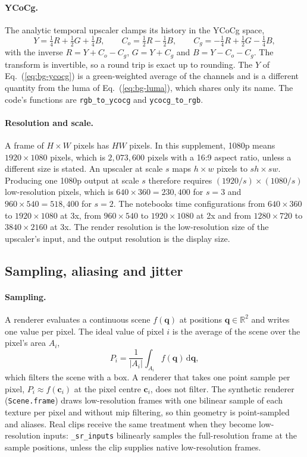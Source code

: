 \paragraph{YCoCg.} The analytic temporal upscaler clamps its history in the YCoCg space,
\begin{equation}
Y=\tfrac14R+\tfrac12G+\tfrac14B,\qquad C_o=\tfrac12R-\tfrac12B,\qquad C_g=-\tfrac14R+\tfrac12G-\tfrac14B,\label{eq:bg-ycocg}
\end{equation}
with the inverse $R=Y+C_o-C_g$, $G=Y+C_g$ and $B=Y-C_o-C_g$. The transform is invertible, so a round trip is exact up to rounding. The $Y$ of Eq.~(\ref{eq:bg-ycocg}) is a green-weighted average of the channels and is a different quantity from the luma of Eq.~(\ref{eq:bg-luma}), which shares only its name. The code's functions are \texttt{rgb\_to\_ycocg} and \texttt{ycocg\_to\_rgb}.

\paragraph{Resolution and scale.} A frame of $H\times W$ pixels has $HW$ pixels. In this supplement, 1080p means $1920\times1080$ pixels, which is $2{,}073{,}600$ pixels with a 16:9 aspect ratio, unless a different size is stated. An upscaler at scale $s$ maps $h\times w$ pixels to $sh\times sw$. Producing one 1080p output at scale $s$ therefore requires $(1920/s)\times(1080/s)$ low-resolution pixels, which is $640\times360=230{,}400$ for $s=3$ and $960\times540=518{,}400$ for $s=2$. The notebooks time configurations from $640\times360$ to $1920\times1080$ at 3x, from $960\times540$ to $1920\times1080$ at 2x and from $1280\times720$ to $3840\times2160$ at 3x. The render resolution is the low-resolution size of the upscaler's input, and the output resolution is the display size.

\subsection{Sampling, aliasing and jitter}\label{sec:bg-sampling}

\paragraph{Sampling.} A renderer evaluates a continuous scene $f(\mathbf q)$ at positions $\mathbf q\in\mathbb R^2$ and writes one value per pixel. The ideal value of pixel $i$ is the average of the scene over the pixel's area $A_i$,
\begin{equation}
P_i=\frac{1}{|A_i|}\int_{A_i}f(\mathbf q)\,\mathrm d\mathbf q,\label{eq:bg-area}
\end{equation}
which filters the scene with a box. A renderer that takes one point sample per pixel, $P_i\approx f(\mathbf c_i)$ at the pixel centre $\mathbf c_i$, does not filter. The synthetic renderer (\texttt{Scene.frame}) draws low-resolution frames with one bilinear sample of each texture per pixel and without mip filtering, so thin geometry is point-sampled and aliases. Real clips receive the same treatment when they become low-resolution inputs: \texttt{\_sr\_inputs} bilinearly samples the full-resolution frame at the sample positions, unless the clip supplies native low-resolution frames.

